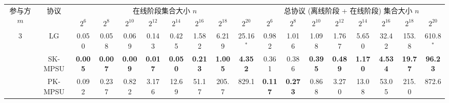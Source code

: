 \begin{table}[p]
\centering
\vspace*{\fill}

\begin{adjustbox}{angle=90,center,scale=0.85}
\begin{tabular}{|c|c|c|c|c|c|c|c|c|c|c|c|c|c|c|c|c|c|}
\hline
\multirow{2}{*}{参与方 $m$} & \multirow{2}{*}{协议} & \multicolumn{8}{c|}{在线阶段集合大小 $n$} & \multicolumn{8}{c|}{总协议 (离线阶段 + 在线阶段) 集合大小 $n$} \\ \cline{3-18} 
 & & \multicolumn{1}{c|}{$2^6$} & \multicolumn{1}{c|}{$2^8$} & \multicolumn{1}{c|}{$2^{10}$} & \multicolumn{1}{c|}{$2^{12}$} & \multicolumn{1}{c|}{$2^{14}$} & \multicolumn{1}{c|}{$2^{16}$} & \multicolumn{1}{c|}{$2^{18}$} & \multicolumn{1}{c|}{$2^{20}$} & \multicolumn{1}{c|}{$2^6$} & \multicolumn{1}{c|}{$2^8$} & \multicolumn{1}{c|}{$2^{10}$} & \multicolumn{1}{c|}{$2^{12}$} & \multicolumn{1}{c|}{$2^{14}$} & \multicolumn{1}{c|}{$2^{16}$} & \multicolumn{1}{c|}{$2^{18}$} & \multicolumn{1}{c|}{$2^{20}$} \\ \hline

\multirow{3}{*}{3} 
 & LG & \multicolumn{1}{c|}{0.050} & \multicolumn{1}{c|}{0.058} & \multicolumn{1}{c|}{0.069} & \multicolumn{1}{c|}{0.143} & \multicolumn{1}{c|}{0.425} & \multicolumn{1}{c|}{1.582} & \multicolumn{1}{c|}{6.219} & \multicolumn{1}{c|}{25.16$^*$} & \multicolumn{1}{c|}{0.982} & \multicolumn{1}{c|}{1.016} & \multicolumn{1}{c|}{1.098} & \multicolumn{1}{c|}{1.767} & \multicolumn{1}{c|}{5.650} & \multicolumn{1}{c|}{32.42} & \multicolumn{1}{c|}{153.8} & \multicolumn{1}{c|}{610.8$^*$} \\ \cline{2-18} 
 & SK-MPSU & \multicolumn{1}{c|}{\textbf{0.005}} & \multicolumn{1}{c|}{\textbf{0.007}} & \multicolumn{1}{c|}{\textbf{0.009}} & \multicolumn{1}{c|}{\textbf{0.017}} & \multicolumn{1}{c|}{\textbf{0.050}} & \multicolumn{1}{c|}{\textbf{0.213}} & \multicolumn{1}{c|}{\textbf{1.005}} & \multicolumn{1}{c|}{\textbf{4.352}} & \multicolumn{1}{c|}{0.361} & \multicolumn{1}{c|}{0.386} & \multicolumn{1}{c|}{\textbf{0.395}} & \multicolumn{1}{c|}{\textbf{0.489}} & \multicolumn{1}{c|}{\textbf{1.170}} & \multicolumn{1}{c|}{\textbf{4.534}} & \multicolumn{1}{c|}{\textbf{19.77}} & \multicolumn{1}{c|}{\textbf{96.23}} \\ \cline{2-18} 
 & PK-MPSU & \multicolumn{1}{c|}{0.092} & \multicolumn{1}{c|}{0.237} & \multicolumn{1}{c|}{0.822} & \multicolumn{1}{c|}{3.176} & \multicolumn{1}{c|}{12.69} & \multicolumn{1}{c|}{51.17} & \multicolumn{1}{c|}{205.7} & \multicolumn{1}{c|}{829.1} & \multicolumn{1}{c|}{\textbf{0.117}} & \multicolumn{1}{c|}{\textbf{0.273}} & \multicolumn{1}{c|}{0.868} & \multicolumn{1}{c|}{3.270} & \multicolumn{1}{c|}{13.08} & \multicolumn{1}{c|}{53.05} & \multicolumn{1}{c|}{215.0} & \multicolumn{1}{c|}{872.6} \\ \hline


\end{tabular}
\end{adjustbox}
\end{table}
